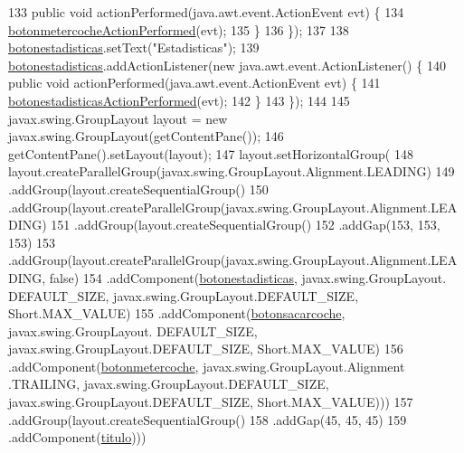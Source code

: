 \begin{DoxyCode}
133             \textcolor{keyword}{public} \textcolor{keywordtype}{void} actionPerformed(java.awt.event.ActionEvent evt) \{
134                 \mbox{\hyperlink{classejercicio2_1_1_interfaz_aeaf9710f39bb49fe8d0a2ab0171740c4}{botonmetercocheActionPerformed}}(evt);
135             \}
136         \});
137 
138         \mbox{\hyperlink{classejercicio2_1_1_interfaz_a7385c1fb6e098f60bb5a8b4b7a31fd65}{botonestadisticas}}.setText(\textcolor{stringliteral}{"Estadisticas"});
139         \mbox{\hyperlink{classejercicio2_1_1_interfaz_a7385c1fb6e098f60bb5a8b4b7a31fd65}{botonestadisticas}}.addActionListener(\textcolor{keyword}{new} java.awt.event.ActionListener() \{
140             \textcolor{keyword}{public} \textcolor{keywordtype}{void} actionPerformed(java.awt.event.ActionEvent evt) \{
141                 \mbox{\hyperlink{classejercicio2_1_1_interfaz_adfb6346933f7d861f81e0f78c2c936b1}{botonestadisticasActionPerformed}}(evt);
142             \}
143         \});
144 
145         javax.swing.GroupLayout layout = \textcolor{keyword}{new} javax.swing.GroupLayout(getContentPane());
146         getContentPane().setLayout(layout);
147         layout.setHorizontalGroup(
148             layout.createParallelGroup(javax.swing.GroupLayout.Alignment.LEADING)
149             .addGroup(layout.createSequentialGroup()
150                 .addGroup(layout.createParallelGroup(javax.swing.GroupLayout.Alignment.LEADING)
151                     .addGroup(layout.createSequentialGroup()
152                         .addGap(153, 153, 153)
153                         .addGroup(layout.createParallelGroup(javax.swing.GroupLayout.Alignment.LEADING, \textcolor{keyword}{
      false})
154                             .addComponent(\mbox{\hyperlink{classejercicio2_1_1_interfaz_a7385c1fb6e098f60bb5a8b4b7a31fd65}{botonestadisticas}}, javax.swing.GroupLayout.
      DEFAULT\_SIZE, javax.swing.GroupLayout.DEFAULT\_SIZE, Short.MAX\_VALUE)
155                             .addComponent(\mbox{\hyperlink{classejercicio2_1_1_interfaz_a643d25060e73ac4c53a95d7b4bfdae52}{botonsacarcoche}}, javax.swing.GroupLayout.
      DEFAULT\_SIZE, javax.swing.GroupLayout.DEFAULT\_SIZE, Short.MAX\_VALUE)
156                             .addComponent(\mbox{\hyperlink{classejercicio2_1_1_interfaz_a312037c2c5b2cd0f23fd65998314ee09}{botonmetercoche}}, javax.swing.GroupLayout.Alignment
      .TRAILING, javax.swing.GroupLayout.DEFAULT\_SIZE, javax.swing.GroupLayout.DEFAULT\_SIZE, Short.MAX\_VALUE)))
157                     .addGroup(layout.createSequentialGroup()
158                         .addGap(45, 45, 45)
159                         .addComponent(\mbox{\hyperlink{classejercicio2_1_1_interfaz_af6343959b01523a71cdf2296b61672e0}{titulo}})))

\end{DoxyCode}
